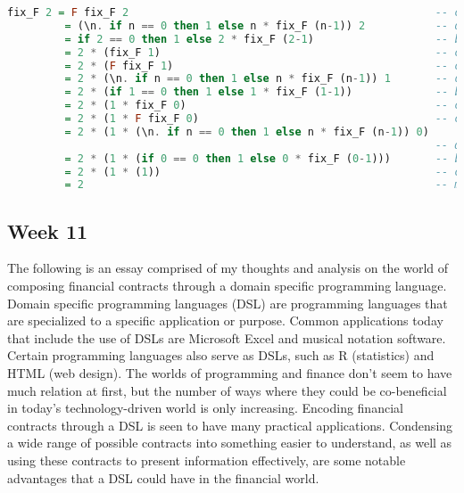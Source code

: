 \documentclass{article}
\theoremstyle{theorem}
\theoremstyle{definition}
\theoremstyle{remark}
\begin{document}
\begin{lstlisting}[language=Haskell]
fix_F 2 = F fix_F 2                                                -- computation rule of fix_F
         = (\n. if n == 0 then 1 else n * fix_F (n-1)) 2           -- definition of F and beta reduction
         = if 2 == 0 then 1 else 2 * fix_F (2-1)                   -- beta reduction of n
         = 2 * (fix_F 1)                                           -- computation rule of if/then/else
         = 2 * (F fix_F 1)                                         -- computation rule of fix_F
         = 2 * (\n. if n == 0 then 1 else n * fix_F (n-1)) 1       -- definition of F and beta reduction
         = 2 * (if 1 == 0 then 1 else 1 * fix_F (1-1))             -- beta reduction of n
         = 2 * (1 * fix_F 0)                                       -- computation rule of if/then/else
         = 2 * (1 * F fix_F 0)                                     -- computation rule of fix_F
         = 2 * (1 * (\n. if n == 0 then 1 else n * fix_F (n-1)) 0) 
                                                                   -- definition of F and beta reduction
         = 2 * (1 * (if 0 == 0 then 1 else 0 * fix_F (0-1)))       -- beta reduction of n
         = 2 * (1 * (1))                                           -- computation rule of if/then/else
         = 2                                                       -- multiplication
\end{lstlisting}
\newpage

\subsection{Week 11}

The following is an essay comprised of my thoughts and analysis on the world of composing financial contracts through a domain specific programming language.\\


Domain specific programming languages (DSL) are programming languages that are specialized to a specific application or purpose. Common applications today that include the use of DSLs are Microsoft Excel and musical notation software. Certain programming languages also serve as DSLs, such as R (statistics) and HTML (web design). The worlds of programming and finance don’t seem to have much relation at first, but the number of ways where they could be co-beneficial in today’s technology-driven world is only increasing. Encoding financial contracts through a DSL is seen to have many practical applications. Condensing a wide range of possible contracts into something easier to understand, as well as using these contracts to present information effectively, are some notable advantages that a DSL could have in the financial world.
\end{document}
